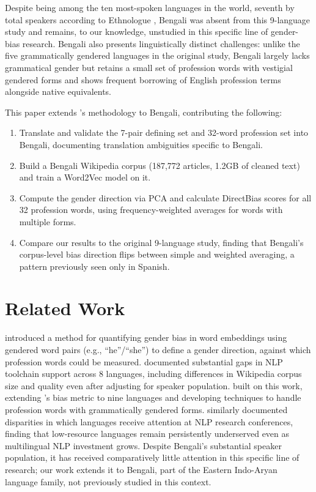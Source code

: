 \documentclass[11pt]{article}
\begin{document}
Despite being among the ten most-spoken languages in the world, seventh by total speakers according to Ethnologue \citep{eberhard2026ethnologue}, Bengali was absent from this 9-language study and remains, to our knowledge, unstudied in this specific line of gender-bias research. Bengali also presents linguistically distinct challenges: unlike the five grammatically gendered languages in the original study, Bengali largely lacks grammatical gender but retains a small set of profession words with vestigial gendered forms and shows frequent borrowing of English profession terms alongside native equivalents.

This paper extends \citet{chen2021gender}'s methodology to Bengali, contributing the following:

\begin{enumerate}
    \item Translate and validate the 7-pair defining set and 32-word profession set into Bengali, documenting translation ambiguities specific to Bengali.
    \item Build a Bengali Wikipedia corpus (187,772 articles, 1.2GB of cleaned text) and train a Word2Vec model on it.
    \item Compute the gender direction via PCA and calculate DirectBias scores for all 32 profession words, using frequency-weighted averages for words with multiple forms.
    \item Compare our results to the original 9-language study, finding that Bengali's corpus-level bias direction flips between simple and weighted averaging, a pattern previously seen only in Spanish.
\end{enumerate}

\section{Related Work}

\citet{bolukbasi2016man} introduced a method for quantifying gender bias in word embeddings using gendered word pairs (e.g., ``he''/``she'') to define a gender direction, against which profession words could be measured. \citet{wali2020machine} documented substantial gaps in NLP toolchain support across 8 languages, including differences in Wikipedia corpus size and quality even after adjusting for speaker population. \citet{chen2021gender} built on this work, extending \citet{bolukbasi2016man}'s bias metric to nine languages and developing techniques to handle profession words with grammatically gendered forms. \citet{joshi2020state} similarly documented disparities in which languages receive attention at NLP research conferences, finding that low-resource languages remain persistently underserved even as multilingual NLP investment grows. Despite Bengali's substantial speaker population, it has received comparatively little attention in this specific line of research; our work extends it to Bengali, part of the Eastern Indo-Aryan language family, not previously studied in this context.
\end{document}

